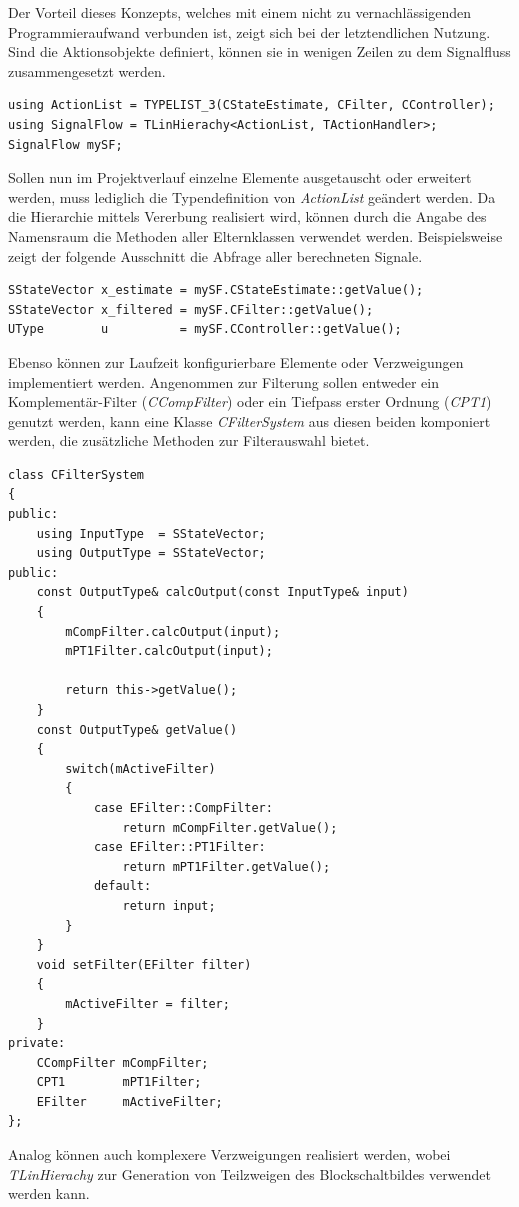 Der Vorteil dieses Konzepts, welches mit einem nicht zu vernachlässigenden Programmieraufwand verbunden ist, zeigt sich bei der letztendlichen Nutzung. Sind die Aktionsobjekte definiert, können sie in wenigen Zeilen zu dem Signalfluss zusammengesetzt werden.
\begin{lstlisting}[caption={Anwendungsbeispiel der linearen Hierarchie},captionpos=b]
using ActionList = TYPELIST_3(CStateEstimate, CFilter, CController);
using SignalFlow = TLinHierachy<ActionList, TActionHandler>;
SignalFlow mySF;
\end{lstlisting}
Sollen nun im Projektverlauf einzelne Elemente ausgetauscht oder erweitert werden, muss lediglich die Typendefinition von \textit{ActionList} geändert werden. Da die Hierarchie mittels Vererbung realisiert wird, können durch die Angabe des Namensraum die Methoden aller Elternklassen verwendet werden. Beispielsweise zeigt der folgende Ausschnitt die Abfrage aller berechneten Signale.
\begin{lstlisting}[caption={Beispiel für den Zugriff auf Aktionsobjekte in der Hierarchie},captionpos=b]
SStateVector x_estimate = mySF.CStateEstimate::getValue();
SStateVector x_filtered = mySF.CFilter::getValue();
UType        u          = mySF.CController::getValue();
\end{lstlisting}
Ebenso können zur Laufzeit konfigurierbare Elemente oder Verzweigungen implementiert werden. Angenommen zur Filterung sollen entweder ein Komplementär-Filter (\textit{CCompFilter}) oder ein Tiefpass erster Ordnung (\textit{CPT1}) genutzt werden, kann eine Klasse \textit{CFilterSystem} aus diesen beiden komponiert werden, die zusätzliche Methoden zur Filterauswahl bietet.
\begin{lstlisting}[caption={Beispiel für die komponierte Aktionsobjekte},captionpos=b]
class CFilterSystem
{
public:
	using InputType  = SStateVector;
	using OutputType = SStateVector;
public:
	const OutputType& calcOutput(const InputType& input)
	{
		mCompFilter.calcOutput(input);
		mPT1Filter.calcOutput(input);
		
		return this->getValue();
	}
	const OutputType& getValue()
	{
		switch(mActiveFilter)
		{
			case EFilter::CompFilter:
				return mCompFilter.getValue();
			case EFilter::PT1Filter:
				return mPT1Filter.getValue();
			default:
				return input;
		}
	}
	void setFilter(EFilter filter)
	{
		mActiveFilter = filter;
	}
private:
	CCompFilter mCompFilter;
	CPT1        mPT1Filter;
	EFilter     mActiveFilter;
};
\end{lstlisting}
Analog können auch komplexere Verzweigungen realisiert werden, wobei \textit{TLinHierachy} zur Generation von Teilzweigen des Blockschaltbildes verwendet werden kann.